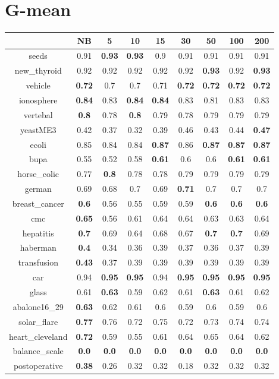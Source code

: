 \documentclass{article}%
\begin{document}
%
\section*{G{-}mean}%
\begin{tabular}{c|cccccccc}%
\hline%
&NB&5&10&15&30&50&100&200\\%
\hline%
seeds&0.91&\textbf{0.93}&\textbf{0.93}&0.9&0.91&0.91&0.91&0.91\\%
new\_thyroid&0.92&0.92&0.92&0.92&0.92&\textbf{0.93}&0.92&\textbf{0.93}\\%
vehicle&\textbf{0.72}&0.7&0.7&0.71&\textbf{0.72}&\textbf{0.72}&\textbf{0.72}&\textbf{0.72}\\%
ionosphere&\textbf{0.84}&0.83&\textbf{0.84}&\textbf{0.84}&0.83&0.81&0.83&0.83\\%
vertebal&\textbf{0.8}&0.78&\textbf{0.8}&0.79&0.78&0.79&0.79&0.79\\%
yeastME3&0.42&0.37&0.32&0.39&0.46&0.43&0.44&\textbf{0.47}\\%
ecoli&0.85&0.84&0.84&\textbf{0.87}&0.86&\textbf{0.87}&\textbf{0.87}&\textbf{0.87}\\%
bupa&0.55&0.52&0.58&\textbf{0.61}&0.6&0.6&\textbf{0.61}&\textbf{0.61}\\%
horse\_colic&0.77&\textbf{0.8}&0.78&0.78&0.79&0.79&0.79&0.79\\%
german&0.69&0.68&0.7&0.69&\textbf{0.71}&0.7&0.7&0.7\\%
breast\_cancer&\textbf{0.6}&0.56&0.55&0.59&0.59&\textbf{0.6}&\textbf{0.6}&\textbf{0.6}\\%
cmc&\textbf{0.65}&0.56&0.61&0.64&0.64&0.63&0.63&0.64\\%
hepatitis&\textbf{0.7}&0.69&0.64&0.68&0.67&\textbf{0.7}&\textbf{0.7}&0.69\\%
haberman&\textbf{0.4}&0.34&0.36&0.39&0.37&0.36&0.37&0.39\\%
transfusion&\textbf{0.43}&0.37&0.39&0.39&0.39&0.39&0.39&0.39\\%
car&0.94&\textbf{0.95}&\textbf{0.95}&0.94&\textbf{0.95}&\textbf{0.95}&\textbf{0.95}&\textbf{0.95}\\%
glass&0.61&\textbf{0.63}&0.59&0.62&0.61&\textbf{0.63}&0.61&0.62\\%
abalone16\_29&\textbf{0.63}&0.62&0.61&0.6&0.59&0.6&0.59&0.6\\%
solar\_flare&\textbf{0.77}&0.76&0.72&0.75&0.72&0.73&0.74&0.74\\%
heart\_cleveland&\textbf{0.72}&0.59&0.55&0.61&0.64&0.65&0.64&0.62\\%
balance\_scale&\textbf{0.0}&\textbf{0.0}&\textbf{0.0}&\textbf{0.0}&\textbf{0.0}&\textbf{0.0}&\textbf{0.0}&\textbf{0.0}\\%
postoperative&\textbf{0.38}&0.26&0.32&0.32&0.18&0.32&0.32&0.32\\%
\end{tabular}

%
\end{document}
